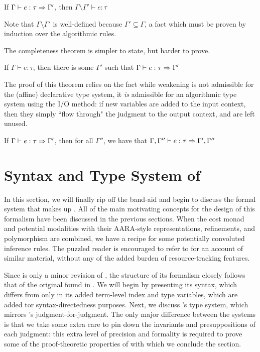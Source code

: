 \begin{theorem}
If $\Gamma \vdash e : \tau \Rightarrow \Gamma'$, then $\Gamma \setminus \Gamma' \vdash e : \tau$
\end{theorem}

Note that $\Gamma \setminus \Gamma'$ is well-defined because $\Gamma' \subseteq \Gamma$, a fact which must be proven by induction over the algorithmic rules.

The completeness theorem is simpler to state, but harder to prove.

\begin{theorem}
If $\Gamma \vdash e : \tau$, then there is some $\Gamma'$ such that $\Gamma \vdash e : \tau \Rightarrow \Gamma'$
\end{theorem}

The proof of this theorem relies on the fact while weakening is not admissible for the (affine) declarative type system, it \textit{is} admissible for an algorithmic type system using the I/O method: if new variables are added to the input context, then they simply ``flow through" the judgment to the output context, and are left unused.

\begin{theorem}
If $\Gamma \vdash e : \tau \Rightarrow \Gamma'$, then for all $\Gamma''$, we have that $\Gamma,\Gamma'' \vdash e : \tau \Rightarrow \Gamma',\Gamma''$
\end{theorem}

\section{Syntax and Type System of \dlambdaamor}
\label{sec:dlambdaamor-syntax-and-types}

In this section, we will finally rip off the band-aid and begin to discuss the formal system that makes up \dlambdaamor. All of the main motivating concepts for the design of this formalism have been discussed in the previous sections. When the cost monad and potential modalities with their AARA-style representations, refinements, and polymorphism are combined, we have a recipe for some potentially convoluted inference rules. The puzzled reader is encouraged to refer to \citet{xi:jfp07} for an account of similar material, without any of the added burden of resource-tracking features.

Since \dlambdaamor is only a minor revision of \lambdaamor, the structure of its formalism closely follows that of the original found in \citet{rajani-et-al:popl21}. 
We will begin by presenting its syntax, which differs from \lambdaamor only in its added term-level index and type variables, which are added tor syntax-directedness purposes. Next, we discuss \dlambdaamor's type system, which mirrors \lambdaamor's judgment-for-judgment. The only major difference between the systems is that we take some extra care to pin down the invariants and presuppositions of each judgment: this extra level of precision and formality is required to prove some of the proof-theoretic properties of \dlambdaamor with which we conclude the section.

